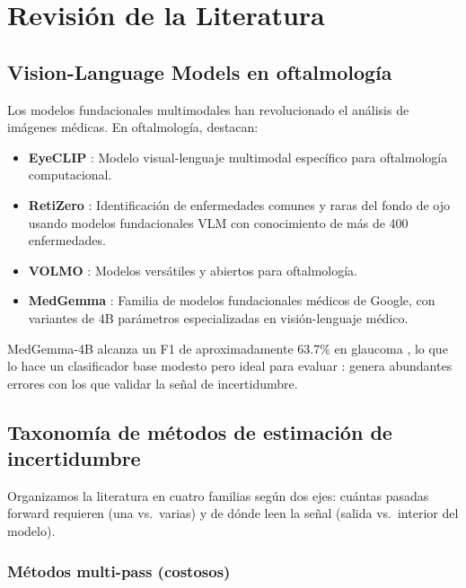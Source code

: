 \documentclass[12pt,a4paper]{article}
\newcommand{\UQ}{\text{UQ}}
\begin{document}
\section{Revisión de la Literatura}
\label{sec:literatura}

\subsection{Vision-Language Models en oftalmología}

Los modelos fundacionales multimodales han revolucionado el análisis de imágenes médicas.
En oftalmología, destacan:

\begin{itemize}[leftmargin=2em]
    \item \textbf{EyeCLIP} \citep{shietal2025eyeclip}: Modelo visual-lenguaje multimodal específico para oftalmología computacional.

    \item \textbf{RetiZero} \citep{retizero2024}: Identificación de enfermedades comunes y raras del fondo de ojo usando modelos fundacionales VLM con conocimiento de más de 400 enfermedades.

    \item \textbf{VOLMO} \citep{volmo2026}: Modelos versátiles y abiertos para oftalmología.

    \item \textbf{MedGemma} \citep{sellergren2025medgemma}: Familia de modelos fundacionales médicos de Google, con variantes de 4B parámetros especializadas en visión-lenguaje médico.
\end{itemize}

MedGemma-4B alcanza un F1 de aproximadamente 63.7\% en glaucoma \citep{volmo2026}, lo que lo hace un clasificador base modesto pero ideal para evaluar \UQ: genera abundantes errores con los que validar la señal de incertidumbre.

\subsection{Taxonomía de métodos de estimación de incertidumbre}

Organizamos la literatura en cuatro familias según dos ejes: cuántas pasadas forward requieren (una vs.~varias) y de dónde leen la señal (salida vs.~interior del modelo).

\subsubsection{Métodos multi-pass (costosos)}
\end{document}
